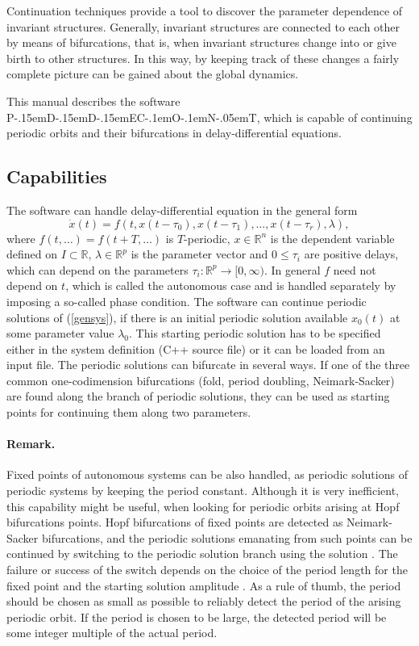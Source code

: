 \documentclass[10pt,a4paper]{ddedoc}
\def\pdde{{P\kern-.15emD\kern-.15emD\kern-.15emE\raisebox{.25ex}{-}C\kern-.1emO\kern-.1emN\kern-.05emT}}
\begin{document}
Continuation techniques provide a tool to discover the parameter dependence of invariant structures. Generally, invariant structures are connected to each other by means of bifurcations, that is, when invariant structures change into or give birth to other structures. In this way, by keeping track of these changes a fairly complete picture can be gained about the global dynamics.

This manual describes the software \pdde, which is capable of continuing periodic orbits and their
bifurcations in delay-differential equations.

\subsection{Capabilities}
\label{capabilities}

The software can handle delay-differential equation in the general form 
\begin{equation}
	\dot{x}(t) = f (t, x(t-\tau_0), x(t - \tau_1), \dots , x(t - \tau_r), \lambda ), \label{gensys}
\end{equation}
where $f(t, \dots ) = f(t + T, \dots)$ is $T$-periodic, $x \in \mathbb{R}^n$ is the dependent variable defined on $I \subset \mathbb{R}$, $\lambda \in \mathbb{R}^p$ is the parameter vector and $0 \le \tau_i$ are positive delays, which can depend on the parameters $\tau_i : \mathbb{R}^p \to [0,\infty)$.
In general $f$ need not depend on $t$, which is called the autonomous case and is handled separately by imposing a so-called phase condition.
The software can continue periodic solutions of (\ref{gensys}), if there is an initial periodic solution available $x_0(t)$ at some parameter value $\lambda_0$. This starting periodic solution has to be specified either in the system definition (C++ source file) or it can be loaded from an input file. The periodic solutions can bifurcate in several ways. If one of the three common one-codimension bifurcations (fold, period doubling, Neimark-Sacker) are found along the branch of periodic solutions, they can be used as starting points for continuing them along two parameters.

\paragraph{Remark.} Fixed points of autonomous systems can be also handled, as periodic solutions of periodic systems by keeping the period constant. Although it is very inefficient, this capability might be useful, when looking for periodic orbits arising at Hopf bifurcations points. Hopf bifurcations of fixed points are detected as Neimark-Sacker bifurcations, and the periodic solutions emanating from such points can be continued by switching to the periodic solution branch using the solution . The failure or success of the switch depends on the choice of the period length for the fixed point and the starting solution amplitude .
As a rule of thumb, the period should be chosen as small as possible to reliably detect the period of the arising periodic orbit. If the period is chosen to be large, the detected period will be some integer multiple of the actual period.
\end{document}
